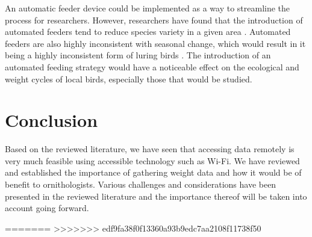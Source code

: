 \documentclass[class=report,11pt,crop=false]{standalone}
\begin{document}
An automatic feeder device could be implemented as a way to streamline the process for researchers. However, researchers have found that the introduction of automated feeders tend to reduce species variety in a given area \cite{GalbraithFeeders}. Automated feeders are also highly inconsistent with seasonal change, which would result in it being a highly inconsistent form of luring birds \cite{GalbraithFeeders}. The introduction of an automated feeding strategy would have a noticeable effect on the ecological and weight cycles of local birds, especially those that would be studied.

\section{Conclusion}

Based on the reviewed literature, we have seen that accessing data remotely is very much feasible using accessible technology such as Wi-Fi. We have reviewed and established the importance of gathering weight data and how it would be of benefit to ornithologists. Various challenges and considerations have been presented in the reviewed literature and the importance thereof will be taken into account going forward. 

=======
>>>>>>> edf9fa38f0f13360a93b9edc7aa2108f11738f50

\ifstandalone

\printnoidxglossary[type=\acronymtype,nonumberlist]
\fi
\end{document}
